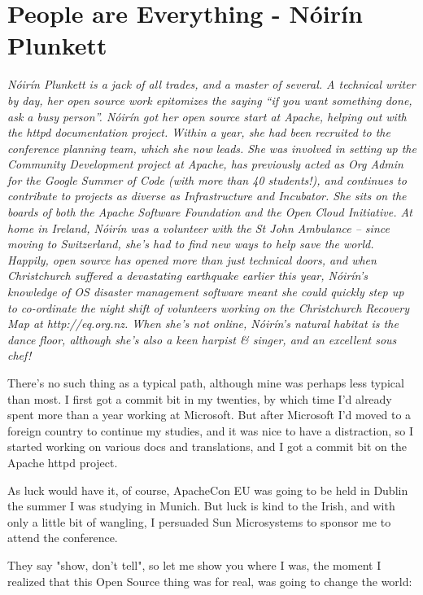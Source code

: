 \chapter{People are Everything - Nóirín Plunkett}

\textit{Nóirín Plunkett is a jack of all trades, and a master of several. A technical writer by day, her open source work epitomizes the saying ``if you want something done, ask a busy person''.
Nóirín got her open source start at Apache, helping out with the httpd documentation project. Within a year, she had been recruited to the conference planning team, which she now leads. She was involved in setting up the Community Development project at Apache, has previously acted as Org Admin for the Google Summer of Code (with more than 40 students!), and continues to contribute to projects as diverse as Infrastructure and Incubator. She sits on the boards of both the Apache Software Foundation and the Open Cloud Initiative.
At home in Ireland, Nóirín was a volunteer with the St John Ambulance -- since moving to Switzerland, she’s had to find new ways to help save the world. Happily, open source has opened more than just technical doors, and when Christchurch suffered a devastating earthquake earlier this year, Nóirín’s knowledge of OS disaster management software meant she could quickly step up to co-ordinate the night shift of volunteers working on the Christchurch Recovery Map at http://eq.org.nz.
When she’s not online, Nóirín’s natural habitat is the dance floor, although she’s also a keen harpist & singer, and an excellent sous chef!}

There's no such thing as a typical path, although mine was perhaps
less typical than most. I first got a commit bit in my twenties, by
which time I'd already spent more than a year working at Microsoft.
But after Microsoft I'd moved to a foreign country to continue my
studies, and it was nice to have a distraction, so I started working
on various docs and translations, and I got a commit bit on the Apache
httpd project.

As luck would have it, of course, ApacheCon EU was going to be held in
Dublin the summer I was studying in Munich. But luck is kind to the
Irish, and with only a little bit of wangling, I persuaded Sun
Microsystems to sponsor me to attend the conference.

They say "show, don't tell", so let me show you where I was, the
moment I realized that this Open Source thing was for real, was going
to change the world:

